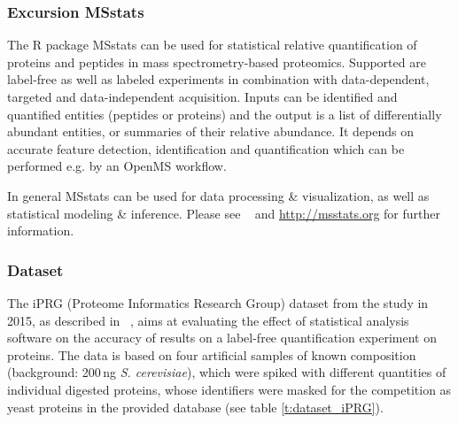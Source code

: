 
\subsubsection{Excursion MSstats}
The R package MSstats can be used for statistical relative quantification of proteins and peptides in mass spectrometry-based proteomics. Supported are label-free as well as labeled experiments in combination with data-dependent, targeted and data-independent acquisition. Inputs can be identified and quantified entities (peptides or proteins) and the output is a list of differentially abundant entities, or summaries of their relative abundance. It depends on accurate feature detection, identification and quantification which can be performed e.g. by an OpenMS workflow. 

\noindent In general MSstats can be used for data processing \& visualization, as well as statistical modeling \& inference. Please see ~\cite{Choi2014MSstats} and \url{http://msstats.org} for further information.

\subsubsection{Dataset}
The iPRG (Proteome Informatics Research Group) dataset from the study in 2015, as described in ~\cite{Choi2017iPRG}, aims at evaluating the effect of statistical analysis software on the accuracy of results on a label-free quantification experiment on proteins. The data is based on four artificial samples of known composition (background: 200\,ng \emph{S. cerevisiae}), which were spiked with different quantities of individual digested proteins, whose identifiers were masked for the competition as yeast proteins in the provided database (see table \ref{t:dataset_iPRG}).

